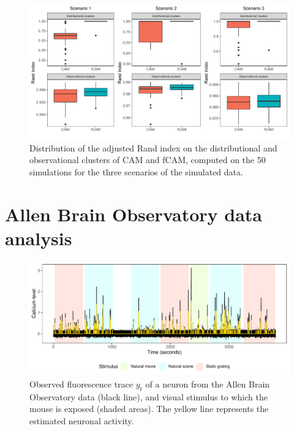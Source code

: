 \begin{figure}
	\centerline{\includegraphics[width = .9\linewidth]{_Images/ch3_rand_index.pdf}}
	\caption[Comparison between the adjusted Rand index of the fCAM and CAM.]{Distribution of the adjusted Rand index on the distributional and observational clusters of CAM and fCAM, computed on the 50 simulations for the three scenarios of the simulated data.}
	\label{fig:rand_index}
\end{figure}



\section{Allen Brain Observatory data analysis}
\label{s:dataanalysis}

\begin{figure}
	\centerline{\includegraphics[width = \linewidth]{_Images/ch3_plot_data_new.pdf}}
	\caption[Observed fluorescence trace of a neuron from the Allen Brain Observatory data and estimated neuronal activity.]{Observed fluorescence trace $y_t$ of a neuron from the Allen Brain Observatory data (black line), and visual stimulus to which the mouse is exposed (shaded areas). The yellow line represents the estimated neuronal activity.}
	\label{fig:y}
\end{figure}

